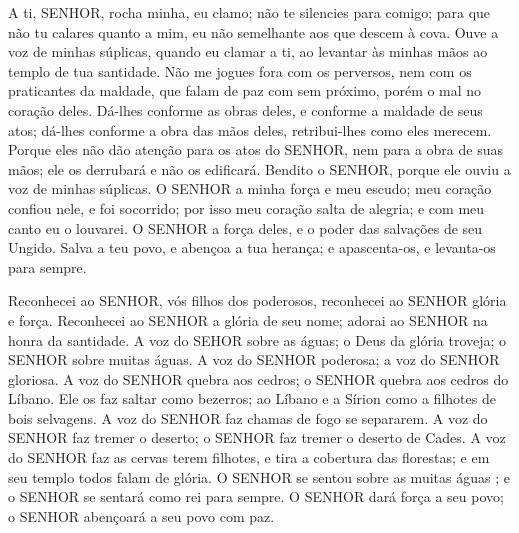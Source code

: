 
{\PP 
  A ti, SENHOR, rocha minha, eu clamo; não te silencies para comigo; para que não
{} tu calares quanto a mim, eu não
{} semelhante aos que descem à cova.
  Ouve a voz de minhas súplicas, quando eu clamar a ti, ao levantar às minhas mãos ao templo de tua santidade.
  Não me jogues fora com os perversos, nem com os praticantes da maldade, que falam de paz com sem próximo, porém
{} o mal no coração deles.
  Dá-lhes conforme as obras deles, e conforme a maldade de seus atos; dá-lhes conforme a obra das mãos deles, retribui-lhes como eles merecem.
  Porque eles não dão atenção para os atos do SENHOR, nem para a obra de suas mãos;
{} ele os derrubará e não os edificará.
  Bendito
{} o SENHOR, porque ele ouviu a voz de minhas súplicas.
  O SENHOR
{} a minha força e meu escudo; meu coração confiou nele, e foi socorrido; por isso meu coração salta de alegria; e com meu canto eu o louvarei.
  O SENHOR
{} a força deles, e o poder das salvações de seu Ungido.
  Salva a teu povo, e abençoa a tua herança; e apascenta-os, e levanta-os para sempre.
\par }


{\PP 
  Reconhecei ao SENHOR, vós filhos dos poderosos, reconhecei ao SENHOR
{} glória e força.
  Reconhecei ao SENHOR a glória de seu nome; adorai ao SENHOR na honra da santidade.
  A voz do SEHOR
{} sobre as águas; o Deus da glória troveja; o SENHOR
{} sobre muitas águas.
  A voz do SENHOR
{} poderosa; a voz do SENHOR
{} gloriosa.
  A voz do SENHOR quebra aos cedros; o SENHOR quebra aos cedros do Líbano.
  Ele os faz saltar como bezerros; ao Líbano e a Sírion como a filhotes de bois selvagens.
  A voz do SENHOR faz chamas de fogo se separarem.
  A voz do SENHOR faz tremer o deserto; o SENHOR faz tremer o deserto de Cades.
  A voz do SENHOR faz as cervas terem filhotes, e tira a cobertura das florestas; e em seu templo todos falam de
{} glória.
  O SENHOR se sentou sobre as muitas águas
{} ; e o SENHOR se sentará como rei para sempre.
  O SENHOR dará força a seu povo; o SENHOR abençoará a seu povo com paz.
\par }

